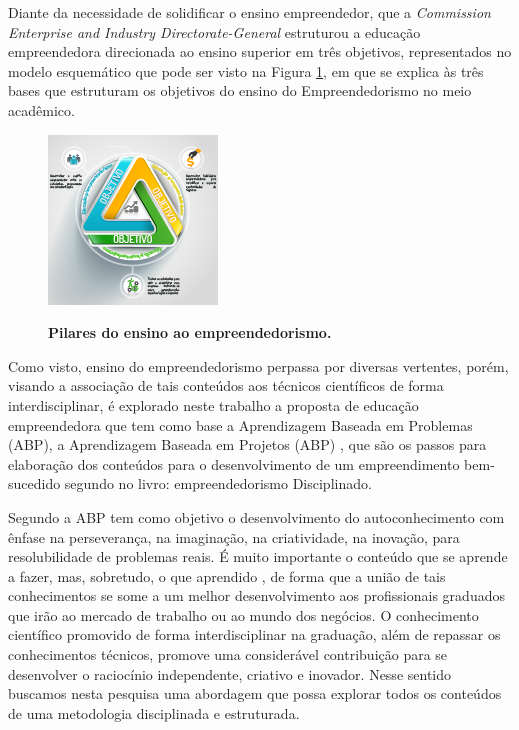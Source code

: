Diante da necessidade de solidificar o ensino empreendedor, que a \textit{Commission Enterprise and Industry Directorate-General} \cite{european_commission_best_2008} estruturou a educação empreendedora direcionada ao ensino superior em três objetivos, representados no modelo esquemático que pode ser visto na Figura \ref{figura_3}, em que se explica às três bases que estruturam os objetivos do ensino do Empreendedorismo no meio acadêmico. 

\begin{figure}[H]
\centering
\caption{\textbf{Pilares do ensino ao empreendedorismo.}}
\includegraphics[scale=2]{Imagens/objetivos_educacao_empreendedora.png}
\label{figura_3}
\end{figure}

Como visto, ensino do empreendedorismo perpassa por diversas vertentes, porém, visando a associação de tais conteúdos aos técnicos científicos de forma interdisciplinar, é explorado neste trabalho a proposta de educação empreendedora que tem como base a Aprendizagem Baseada em Problemas (ABP), a Aprendizagem Baseada em Projetos (ABP) \cite{bender_aprendizagem_2015}, que são os passos para elaboração dos conteúdos para o desenvolvimento de um empreendimento bem-sucedido segundo \cite{aulet_empreendedorismo_2019} no livro: empreendedorismo Disciplinado. 

Segundo  a ABP tem como objetivo o desenvolvimento do autoconhecimento com ênfase na perseverança, na imaginação, na criatividade, na inovação, para resolubilidade de problemas reais. É muito importante o conteúdo que se aprende a fazer, mas, sobretudo, o que aprendido \cite{souza_disseminacao_2001}, de forma que a união de tais conhecimentos se some a um melhor desenvolvimento aos profissionais graduados que irão ao mercado de trabalho ou ao mundo dos negócios. O conhecimento científico promovido de forma interdisciplinar na graduação, além de repassar os conhecimentos técnicos, promove uma considerável contribuição para se desenvolver o raciocínio independente, criativo e inovador. Nesse sentido buscamos nesta pesquisa uma abordagem que possa explorar todos os conteúdos de uma metodologia disciplinada e estruturada.

